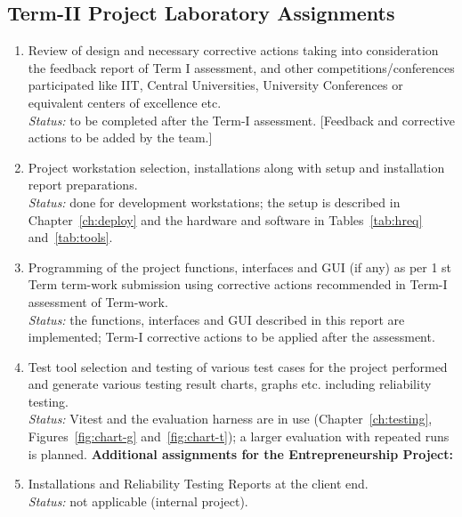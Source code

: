 \documentclass[oneside,a4paper,12pt]{report}
\begin{document}
\begin{appendices}
\chapter{ Term-II Project Laboratory Assignments}
\begin{enumerate}
\item Review of design and necessary corrective actions taking into consideration the feedback report of Term I assessment, and other competitions/conferences participated like IIT, Central Universities, University Conferences or equivalent centers of excellence etc.\\
\emph{Status:} to be completed after the Term-I assessment. [Feedback and corrective actions to be added by the team.]
\item Project workstation selection, installations along with setup and installation report preparations.\\
\emph{Status:} done for development workstations; the setup is described in Chapter~\ref{ch:deploy} and the hardware and software in Tables~\ref{tab:hreq} and~\ref{tab:tools}.
\item Programming of the project functions, interfaces and GUI (if any) as per 1 st Term term-work submission using corrective actions recommended in Term-I assessment of Term-work.\\
\emph{Status:} the functions, interfaces and GUI described in this report are implemented; Term-I corrective actions to be applied after the assessment.
\item Test tool selection and testing of various test cases for the project performed and generate various testing result charts, graphs etc. including reliability testing.\\
\emph{Status:} Vitest and the evaluation harness are in use (Chapter~\ref{ch:testing}, Figures~\ref{fig:chart-g} and~\ref{fig:chart-t}); a larger evaluation with repeated runs is planned.
\textbf{Additional assignments for the Entrepreneurship Project:}
\item Installations and Reliability Testing Reports at the client end.\\
\emph{Status:} not applicable (internal project).

\end{enumerate}

\end{appendices}
\end{document}
